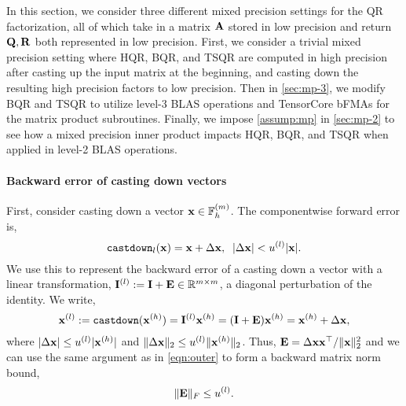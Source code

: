 In this section, we consider three different mixed precision settings for the QR factorization, all of which take in a matrix $\mathbf{A}$ stored in low precision and return $\mathbf{Q},\mathbf{R}$ both represented in low precision. 
First, we consider a trivial mixed precision setting where HQR, BQR, and TSQR are computed in high precision after casting up the input matrix at the beginning, and casting down the resulting high precision factors to low precision. 
Then in \cref{sec:mp-3}, we modify BQR and TSQR to utilize level-3 BLAS operations and TensorCore bFMAs for the matrix product subroutines. 
Finally, we impose \cref{assump:mp} in \cref{sec:mp-2} to see how a mixed precision inner product impacts HQR, BQR, and TSQR when applied in level-2 BLAS operations.

\paragraph{Backward error of casting down vectors} First, consider 
casting down a vector  $\mathbf{x}\in\mathbb{F}_h^{(m)}$.
The componentwise forward error is, \[\text{\tt castdown}_{l}(\mathbf{x}) = \mathbf{x} + \Delta {\mathbf{x}},\;\; |\Delta\mathbf{x}| < u^{(l)}|\mathbf{x}|.\]
We use this to represent the backward error of a casting down a vector with a linear transformation, $\mathbf{I}^{(l)}:=\mathbf{I} +\mathbf{E}\in\mathbb{R}^{m\times m}$, a diagonal perturbation of the identity.
We write,
\begin{equation}
\mathbf{x}^{(l)} := \text{\tt castdown}(\mathbf{x}^{(h)}) = \mathbf{I}^{(l)}\mathbf{x}^{(h)} = (\mathbf{I}+\mathbf{E})\mathbf{x}^{(h)} = \mathbf{x}^{(h)}+\Delta \mathbf{x},
\end{equation}
where $|\Delta \mathbf{x}| \leq u^{(l)} |\mathbf{x}^{(h)}|$ and  $\|\Delta \mathbf{x}\|_2 \leq u^{(l)} \|\mathbf{x}^{(h)}\|_2$.
Thus, $\mathbf{E} = \Delta \mathbf{x x}^{\top}/\|\mathbf{x}\|_2^2$ and we can use the same argument as in \cref{eqn:outer} to form a backward matrix norm bound, 
\begin{equation}
\|\bb{E}\|_F\leq u^{(l)}. \label{eqn:castdown}
\end{equation}

